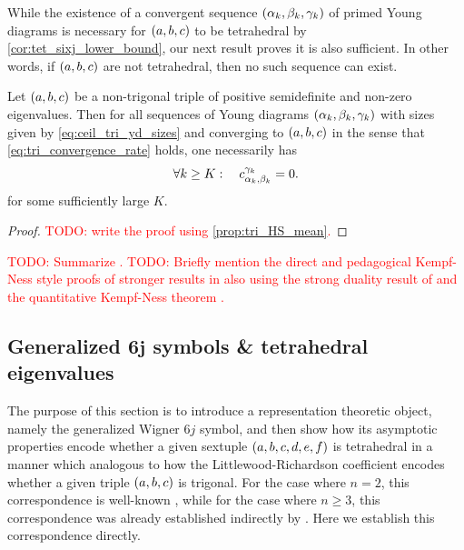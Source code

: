 \documentclass[notitlepage, 10pt]{article}
\begin{document}
While the existence of a convergent sequence $(\alpha_k, \beta_k, \gamma_k)$ of primed Young diagrams is necessary for $(a,b,c)$ to be tetrahedral by \cref{cor:tet_sixj_lower_bound}, our next result proves it is also sufficient.
In other words, if $(a,b,c)$ are not tetrahedral, then no such sequence can exist.

\begin{cor}
    Let $(a, b, c)$ be a non-trigonal triple of positive semidefinite and non-zero eigenvalues.
    Then for all sequences of Young diagrams $(\alpha_k, \beta_k, \gamma_k)$ with sizes given by \cref{eq:ceil_tri_yd_sizes} and converging to $(a,b,c)$ in the sense that \cref{eq:tri_convergence_rate} holds, one necessarily has
    \begin{equation}
        \forall k \geq K: \quad c^{\gamma_k}_{\alpha_k,\beta_k} = 0.
    \end{equation}
    for some sufficiently large $K$.
\end{cor}
\begin{proof}
    \textcolor{red}{TODO: write the proof using \cref{prop:tri_HS_mean}.}
\end{proof}

\textcolor{red}{TODO: Summarize \cite{christandl2008quantum}.}
\textcolor{red}{TODO: Briefly mention the direct and pedagogical Kempf-Ness style proofs of stronger results in \cite[Proposition 2.3]{berline2018horn} also using the strong duality result of \cite[Theorem 1 \& Proposition 3.1]{franks2020minimal} and the quantitative Kempf-Ness theorem \cite[Theorem 1.17]{burgisser2019towards}.}

\subsection{Generalized \texorpdfstring{$\boldsymbol{6j}$}{6j} symbols \& tetrahedral eigenvalues}
\label{sec:sixj_tet}

The purpose of this section is to introduce a representation theoretic object, namely the generalized Wigner $6j$ symbol, and then show how its asymptotic properties encode whether a given sextuple $(a,b,c,d,e,f)$ is tetrahedral in a manner which analogous to how the Littlewood-Richardson coefficient encodes whether a given triple $(a,b,c)$ is trigonal.
For the case where $n=2$, this correspondence is well-known \cite{roberts1999classical,ponzano1968semiclassical,backens2010sixjsymbols}, while for the case where $n \geq 3$, this correspondence was already established indirectly by \citeauthor{christandl2018recoupling} \cite{christandl2018recoupling}.
Here we establish this correspondence directly.
\end{document}
